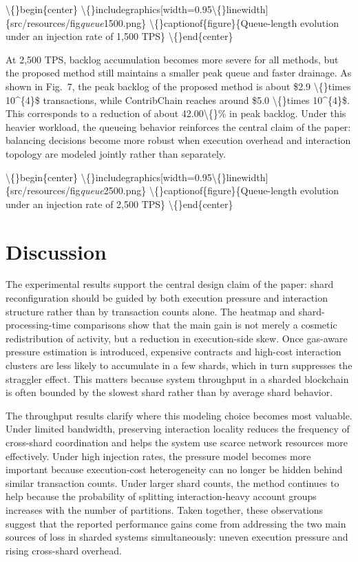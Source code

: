 \documentclass{article}
\begin{document}
\textbackslash\{\}begin\{center\}
    \textbackslash\{\}includegraphics[width=0.95\textbackslash\{\}linewidth]\{src/resources/fig\emph{queue}1500.png\}
    \textbackslash\{\}captionof\{figure\}\{Queue-length evolution under an injection rate of 1,500 TPS\}
\textbackslash\{\}end\{center\}

At 2,500 TPS, backlog accumulation becomes more severe for all methods, but the proposed method still maintains a smaller peak queue and faster drainage. As shown in Fig.~7, the peak backlog of the proposed method is about \$2.9 \textbackslash\{\}times 10^\{4\}\$ transactions, while ContribChain reaches around \$5.0 \textbackslash\{\}times 10^\{4\}\$. This corresponds to a reduction of about 42.00\textbackslash\{\}\% in peak backlog. Under this heavier workload, the queueing behavior reinforces the central claim of the paper: balancing decisions become more robust when execution overhead and interaction topology are modeled jointly rather than separately.

\textbackslash\{\}begin\{center\}
    \textbackslash\{\}includegraphics[width=0.95\textbackslash\{\}linewidth]\{src/resources/fig\emph{queue}2500.png\}
    \textbackslash\{\}captionof\{figure\}\{Queue-length evolution under an injection rate of 2,500 TPS\}
\textbackslash\{\}end\{center\}

\section{Discussion}\label{sec:discussion}

The experimental results support the central design claim of the paper: shard reconfiguration should be guided by both execution pressure and interaction structure rather than by transaction counts alone. The heatmap and shard-processing-time comparisons show that the main gain is not merely a cosmetic redistribution of activity, but a reduction in execution-side skew. Once gas-aware pressure estimation is introduced, expensive contracts and high-cost interaction clusters are less likely to accumulate in a few shards, which in turn suppresses the straggler effect. This matters because system throughput in a sharded blockchain is often bounded by the slowest shard rather than by average shard behavior.

The throughput results clarify where this modeling choice becomes most valuable. Under limited bandwidth, preserving interaction locality reduces the frequency of cross-shard coordination and helps the system use scarce network resources more effectively. Under high injection rates, the pressure model becomes more important because execution-cost heterogeneity can no longer be hidden behind similar transaction counts. Under larger shard counts, the method continues to help because the probability of splitting interaction-heavy account groups increases with the number of partitions. Taken together, these observations suggest that the reported performance gains come from addressing the two main sources of loss in sharded systems simultaneously: uneven execution pressure and rising cross-shard overhead.
\end{document}
